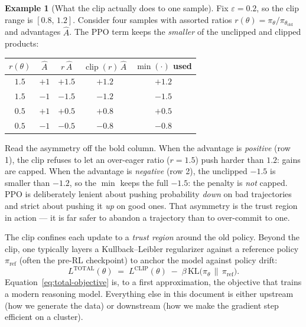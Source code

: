 \documentclass[11pt,a4paper]{article}
\theoremstyle{definition}
\newtheorem{example}[definition]{Example}
\theoremstyle{plain}
\newcommand{\KL}{\mathrm{KL}}
\newcommand{\policy}{\pi_\theta}
\newcommand{\oldpolicy}{\pi_{\theta_{\text{old}}}}
\newcommand{\refpolicy}{\pi_{\text{ref}}}
\begin{document}
\begin{example}[What the clip actually does to one sample]
Fix $\varepsilon = 0.2$, so the clip range is $[0.8,\,1.2]$. Consider four
samples with assorted ratios $r(\theta)=\policy/\oldpolicy$ and advantages
$\hat A$. The PPO term keeps the \emph{smaller} of the unclipped and clipped
products:
\begin{center}
\renewcommand{\arraystretch}{1.3}
\begin{tabular}{@{}ccccc@{}}
\toprule
$r(\theta)$ & $\hat A$ & $r\,\hat A$ & $\operatorname{clip}(r)\,\hat A$ & $\min(\cdot)$ used \\
\midrule
$1.5$ & $+1$ & $+1.5$ & $+1.2$ & $\mathbf{+1.2}$ \\
$1.5$ & $-1$ & $-1.5$ & $-1.2$ & $\mathbf{-1.5}$ \\
$0.5$ & $+1$ & $+0.5$ & $+0.8$ & $\mathbf{+0.5}$ \\
$0.5$ & $-1$ & $-0.5$ & $-0.8$ & $\mathbf{-0.8}$ \\
\bottomrule
\end{tabular}
\end{center}
Read the asymmetry off the bold column. When the advantage is
\emph{positive} (row 1), the clip refuses to let an over-eager ratio
($r=1.5$) push harder than $1.2$: gains are capped. When the advantage is
\emph{negative} (row 2), the unclipped $-1.5$ is smaller than $-1.2$, so the
$\min$ keeps the full $-1.5$: the penalty is \emph{not} capped. PPO is
deliberately lenient about pushing probability \emph{down} on bad trajectories
and strict about pushing it \emph{up} on good ones. That asymmetry is the
trust region in action --- it is far safer to abandon a trajectory than to
over-commit to one.
\end{example}


The clip confines each update to a \emph{trust region} around the old policy. Beyond the clip, one typically layers a Kullback--Leibler regularizer against a reference policy $\pi_{\text{ref}}$ (often the pre-RL checkpoint) to anchor the model against policy drift:
\begin{equation}
  L^{\text{TOTAL}}(\theta) \;=\; L^{\text{CLIP}}(\theta) \;-\; \beta\, \KL\!\bigl(\pi_\theta \,\big\|\, \refpolicy\bigr).
  \label{eq:total-objective}
\end{equation}
Equation~\eqref{eq:total-objective} is, to a first approximation, the objective that trains a modern reasoning model. Everything else in this document is either upstream (how we generate the data) or downstream (how we make the gradient step efficient on a cluster).
\end{document}
